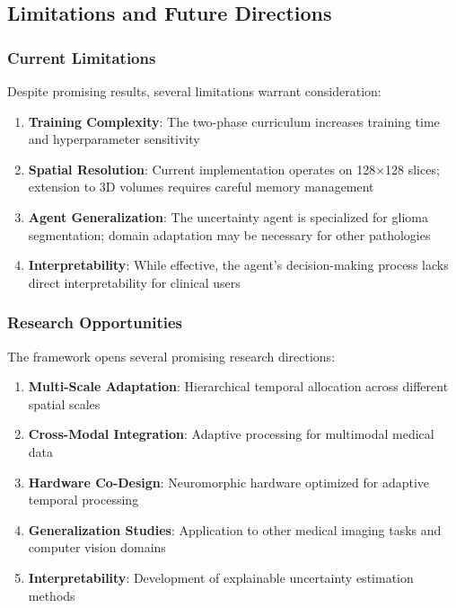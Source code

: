 \documentclass[12pt,a4paper]{article}
\begin{document}
\subsection{Limitations and Future Directions}

\subsubsection{Current Limitations}

Despite promising results, several limitations warrant consideration:

\begin{enumerate}
\item \textbf{Training Complexity}: The two-phase curriculum increases training time and hyperparameter sensitivity
\item \textbf{Spatial Resolution}: Current implementation operates on 128×128 slices; extension to 3D volumes requires careful memory management
\item \textbf{Agent Generalization}: The uncertainty agent is specialized for glioma segmentation; domain adaptation may be necessary for other pathologies
\item \textbf{Interpretability}: While effective, the agent's decision-making process lacks direct interpretability for clinical users
\end{enumerate}

\subsubsection{Research Opportunities}

The framework opens several promising research directions:

\begin{enumerate}
\item \textbf{Multi-Scale Adaptation}: Hierarchical temporal allocation across different spatial scales
\item \textbf{Cross-Modal Integration}: Adaptive processing for multimodal medical data
\item \textbf{Hardware Co-Design}: Neuromorphic hardware optimized for adaptive temporal processing
\item \textbf{Generalization Studies}: Application to other medical imaging tasks and computer vision domains
\item \textbf{Interpretability}: Development of explainable uncertainty estimation methods
\end{enumerate}
\end{document}
